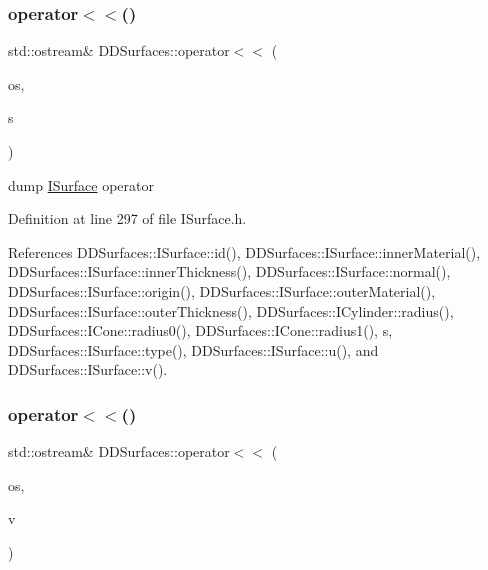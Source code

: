 \hypertarget{namespace_d_d_surfaces_a13440819dc71cf67cecba8bb55f72726}{}\label{namespace_d_d_surfaces_a13440819dc71cf67cecba8bb55f72726} 
\subsubsection{\texorpdfstring{operator$<$$<$()}{operator<<()}\hspace{0.1cm}{\footnotesize\ttfamily [3/4]}}
{\footnotesize\ttfamily std\+::ostream\& D\+D\+Surfaces\+::operator$<$$<$ (\begin{DoxyParamCaption}\item[{std\+::ostream \&}]{os,  }\item[{const \hyperlink{class_d_d_surfaces_1_1_i_surface}{I\+Surface} \&}]{s }\end{DoxyParamCaption})\hspace{0.3cm}{\ttfamily [inline]}}



dump \hyperlink{class_d_d_surfaces_1_1_i_surface}{I\+Surface} operator 



Definition at line 297 of file I\+Surface.\+h.



References D\+D\+Surfaces\+::\+I\+Surface\+::id(), D\+D\+Surfaces\+::\+I\+Surface\+::inner\+Material(), D\+D\+Surfaces\+::\+I\+Surface\+::inner\+Thickness(), D\+D\+Surfaces\+::\+I\+Surface\+::normal(), D\+D\+Surfaces\+::\+I\+Surface\+::origin(), D\+D\+Surfaces\+::\+I\+Surface\+::outer\+Material(), D\+D\+Surfaces\+::\+I\+Surface\+::outer\+Thickness(), D\+D\+Surfaces\+::\+I\+Cylinder\+::radius(), D\+D\+Surfaces\+::\+I\+Cone\+::radius0(), D\+D\+Surfaces\+::\+I\+Cone\+::radius1(), s, D\+D\+Surfaces\+::\+I\+Surface\+::type(), D\+D\+Surfaces\+::\+I\+Surface\+::u(), and D\+D\+Surfaces\+::\+I\+Surface\+::v().

\hypertarget{namespace_d_d_surfaces_a7253b384ad158db02712cc561182ce19}{}\label{namespace_d_d_surfaces_a7253b384ad158db02712cc561182ce19} 
\subsubsection{\texorpdfstring{operator$<$$<$()}{operator<<()}\hspace{0.1cm}{\footnotesize\ttfamily [4/4]}}
{\footnotesize\ttfamily std\+::ostream\& D\+D\+Surfaces\+::operator$<$$<$ (\begin{DoxyParamCaption}\item[{std\+::ostream \&}]{os,  }\item[{const \hyperlink{class_d_d_surfaces_1_1_vector3_d}{Vector3D} \&}]{v }\end{DoxyParamCaption})\hspace{0.3cm}{\ttfamily [inline]}}

